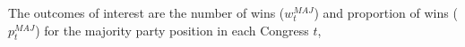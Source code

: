 %
%
%
%
%
%
%
%



\noindent The outcomes of interest are the number of wins ($w_t^{MAJ}$) and proportion of wins ($p_t^{MAJ}$) for the majority party position in each Congress $t$,

